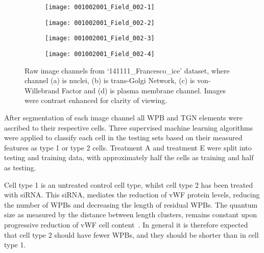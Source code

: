 \begin{figure}[ht]\centering
	\begin{subfigure}[b]{0.5\linewidth}
		\centering
		\texttt{[image: 001002001\_Field\_002-1]} 
		\caption{}
		\label{001002001_Field_002-1} 
		\vspace{1ex}
	\end{subfigure}%
	\hfill
	\begin{subfigure}[b]{0.5\linewidth}
		\centering
		\texttt{[image: 001002001\_Field\_002-2]} 
		\caption{}
		\label{001002001_Field_002-2} 
		\vspace{1ex}
	\end{subfigure} 
	\hfill
	\begin{subfigure}[c]{0.5\linewidth}
		\centering
		\texttt{[image: 001002001\_Field\_002-3]} 
		\caption{}
		\label{001002001_Field_002-3} 
		\vspace{1ex}
	\end{subfigure}%
	\hfill
	\begin{subfigure}[d]{0.5\linewidth}
		\centering
		\texttt{[image: 001002001\_Field\_002-4]} 
		\caption{}
		\label{001002001_Field_002-4} 
		\vspace{1ex}
	\end{subfigure} 
\caption{Raw image channels from `141111\_Francesco\_ice' dataset, where channel (a) is nuclei, (b) is trans-Golgi Network, (c) is von-Willebrand Factor and (d) is plasma membrane channel. Images were contrast enhanced for clarity of viewing. }
\label{imageChannels}
\end{figure}
\FloatBarrier
After segmentation of each image channel all WPB and TGN elements were ascribed to their respective cells. Three supervised machine learning algorithms were applied to classify each cell in the testing sets based on their measured features as type 1 or type 2 cells. Treatment A and treatment E were split into testing and training data, with approximately half the cells as training and half as testing.

Cell type 1 is an untreated control cell type, whilst cell type 2 has been treated with siRNA. This siRNA, mediates the reduction of vWF protein levels, reducing the number of WPBs and decreasing the length of residual WPBs. The quantum size as measured by the distance between length clusters, remains constant upon progressive reduction of vWF cell content~\cite{Ferraro2014}. In general it is therefore expected that cell type 2 should have fewer WPBs, and they should be shorter than in cell type 1.


